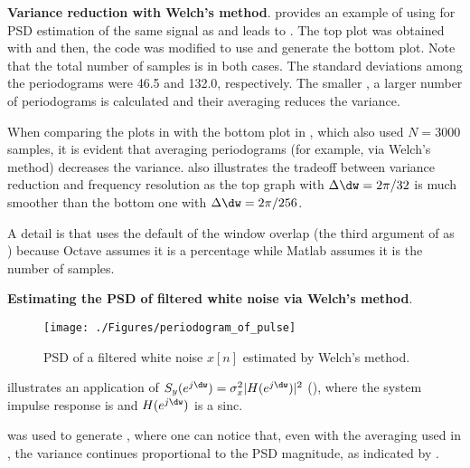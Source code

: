 \bExample \textbf{Variance reduction with Welch's method}.
 provides an example of using  for PSD estimation of the same signal as  and leads to . The top plot was obtained with  and then, the
code was modified to use  and generate the bottom plot. Note that the total number of samples is  in both cases. The standard deviations among the periodograms were 46.5 and 132.0, respectively. The smaller , a larger number of periodograms is calculated and their averaging reduces the variance.


When comparing the plots in  with the bottom plot in , which also used $N=3000$ samples, 
it is evident that averaging periodograms (for example, via Welch's method) decreases the variance.  also illustrates the tradeoff between variance reduction and frequency resolution as the top graph with $\Delta \dw = 2 \pi/32$ is much smoother than the bottom one with $\Delta \dw = 2 \pi/256$.

A detail is that  uses the default of the window overlap (the third argument of  as \ci{[]}) because Octave assumes it is a percentage while Matlab assumes it is the number of samples.
\eExample 

\bExample \textbf{Estimating the PSD of filtered white noise via Welch's method}.
\begin{figure}[htbp]
\centering
\texttt{[image: ./Figures/periodogram\_of\_pulse]}
\caption{PSD of a filtered white noise $x[n]$ estimated by Welch's method.\label{fig:periodogram_of_pulse}}
\end{figure}

 illustrates an application of $S_y(e^{j \dw}) = \sigma_x^2 |H(e^{j \dw})|^2$ (), where the system impulse response is  and $H(e^{j \dw})$ is a sinc. 


 was used to generate , where one can notice that, even with the averaging used in , the variance continues proportional to the PSD magnitude, as indicated by .
\eExample 

